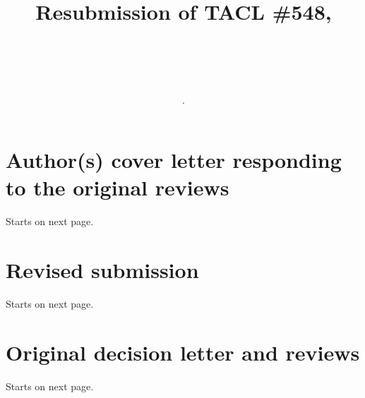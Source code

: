 \documentclass{article}[11pt,oneside]
\title{Resubmission of TACL \#548, \\ \subtitle.   \\}
\newcommand{\resubmission}{paper.pdf}  %
\newcommand{\origdecision}{decision.pdf}  %
\newcommand{\coverfile}{our-cover-letter.pdf}  %
\begin{document}
\maketitle

\tableofcontents

\section{Author(s) cover letter responding to the original reviews} Starts on next page.

\section{Revised submission} Starts on next page.

\section{Original decision letter and reviews} Starts on next page.

\end{document}
